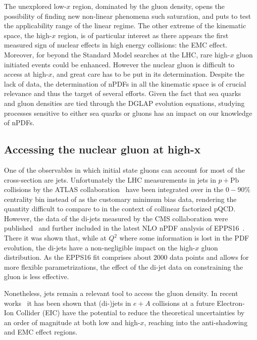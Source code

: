 The unexplored low-$x$ region, dominated by the gluon density, opens the possibility of finding new non-linear phenomena such saturation, and puts to test the applicability range of the linear regime. The other extreme of the kinematic space, the high-$x$ region, is of particular interest as there appears the first measured sign of nuclear effects in high energy collisions: the EMC effect. Moreover, for beyond the Standard Model searches at the LHC, rare high-$x$ gluon initiated events could be enhanced. However the nuclear gluon is difficult to access at high-$x$, and great care has to be put in its determination. Despite the lack of data, the determination of nPDFs in all the kinematic space is of crucial relevance and thus the target of several efforts. Given the fact that sea quarks and gluon densities are tied through the DGLAP evolution equations, studying processes sensitive to either sea quarks or gluons has an impact on our knowledge of nPDFs.    

\subsection{Accessing the nuclear gluon at high-x}

One of the observables in which initial state gluons can account for most of the cross-section are jets. Unfortunately the LHC measurements in jets in $p+\mathrm{Pb}$ collisions by the ATLAS collaboration~\cite{ATLAS:2014cpa} have been integrated over in the $0-90\%$ centrality bin instead of as the customary minimum bias data, rendering the quantity difficult to compare to in the context of collinear factorized pQCD. However, the data of the di-jets measured by the CMS collaboration were published~\cite{Chatrchyan:2014hqa} and further included in the latest NLO nPDF analysis of EPPS16~\cite{Eskola:2016oht}. There it was shown that, while at $Q^{2}$ where some information is lost in the PDF evolution, the di-jets have a non-negligible impact on the high-$x$ gluon distribution. As the EPPS16 fit comprises about $2000$ data points and allows for more flexible parametrizations, the effect of the di-jet data on constraining the gluon is less effective. %

Nonetheless, jets remain a relevant tool to access the gluon density. In recent works~\cite{PhysRevD.95.094013, PhysRevD.97.114013} it has been shown that (di-)jets in $e+A$ collisions at a future Electron-Ion Collider (EIC) have the potential to reduce the theoretical uncertainties by an order of magnitude at both low and high-$x$, reaching into the anti-shadowing and EMC effect regions.

